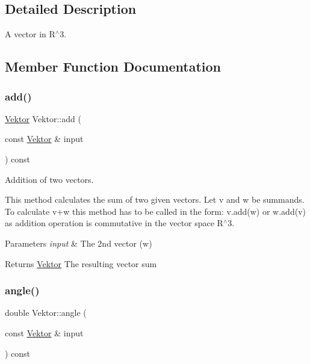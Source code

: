 \subsection{Detailed Description}
A vector in R$^\wedge$3. 

\subsection{Member Function Documentation}
\mbox{\label{class_vektor_aeafef3c21fdf2ad7edca844826e111bf}} 
\subsubsection{\texorpdfstring{add()}{add()}}
{\footnotesize\ttfamily \hyperlink{class_vektor}{Vektor} Vektor\+::add (\begin{DoxyParamCaption}\item[{const \hyperlink{class_vektor}{Vektor} \&}]{input }\end{DoxyParamCaption}) const}



Addition of two vectors. 

This method calculates the sum of two given vectors. Let v and w be summands. To calculate v+w this method has to be called in the form\+: v.\+add(w) or w.\+add(v) as addition operation is commutative in the vector space R$^\wedge$3.


\begin{DoxyParams}{Parameters}
{\em input} & The 2nd vector (w) \\
\hline
\end{DoxyParams}
\begin{DoxyReturn}{Returns}
\hyperlink{class_vektor}{Vektor} The resulting vector sum 
\end{DoxyReturn}
\mbox{\label{class_vektor_a33baaca0958a73d60f19500ad59d4288}} 
\subsubsection{\texorpdfstring{angle()}{angle()}}
{\footnotesize\ttfamily double Vektor\+::angle (\begin{DoxyParamCaption}\item[{const \hyperlink{class_vektor}{Vektor} \&}]{input }\end{DoxyParamCaption}) const}



